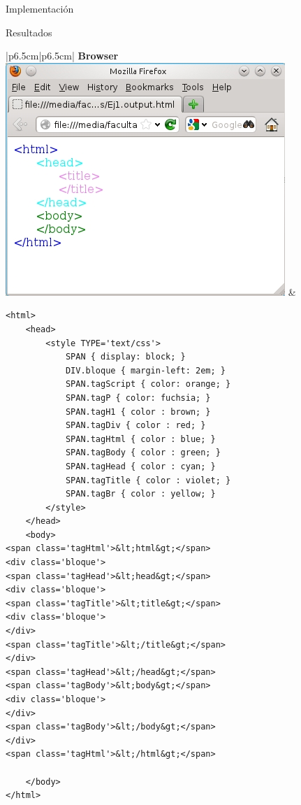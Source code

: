 \documentclass[a4paper,8pt]{article}
\begin{document}
\begin{section}{Implementación}
\begin{subsection}{Resultados}
\begin{tabular}{|p{6.5cm}|p{6.5cm}|}
\bigskip
\textbf{Browser}\linebreak \linebreak
\centering \includegraphics[scale=0.50]{ej1_out.jpg} & \footnotesize{\begin{verbatim}<html>
    <head>
        <style TYPE='text/css'>
            SPAN { display: block; }
            DIV.bloque { margin-left: 2em; }
            SPAN.tagScript { color: orange; }
            SPAN.tagP { color: fuchsia; }
            SPAN.tagH1 { color : brown; }
            SPAN.tagDiv { color : red; }
            SPAN.tagHtml { color : blue; }
            SPAN.tagBody { color : green; }
            SPAN.tagHead { color : cyan; }
            SPAN.tagTitle { color : violet; }
            SPAN.tagBr { color : yellow; }
        </style>
    </head>
    <body>
<span class='tagHtml'>&lt;html&gt;</span>
<div class='bloque'>
<span class='tagHead'>&lt;head&gt;</span>
<div class='bloque'>
<span class='tagTitle'>&lt;title&gt;</span>
<div class='bloque'>
</div>
<span class='tagTitle'>&lt;/title&gt;</span>
</div>
<span class='tagHead'>&lt;/head&gt;</span>
<span class='tagBody'>&lt;body&gt;</span>
<div class='bloque'>
</div>
<span class='tagBody'>&lt;/body&gt;</span>
</div>
<span class='tagHtml'>&lt;/html&gt;</span>

    </body>
</html>\end{verbatim}}\\
\hline

\end{tabular}



\end{subsection}
\end{section}
\end{document}
